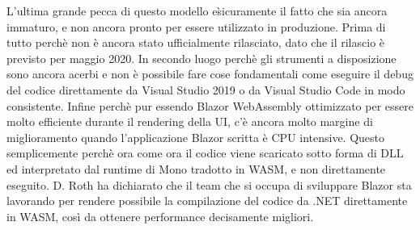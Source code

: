 L'ultima grande pecca di questo modello e\` sicuramente il fatto che sia ancora immaturo, e non ancora pronto per essere utilizzato in produzione.
Prima di tutto perch\`e non \`e ancora stato ufficialmente rilasciato, dato che il rilascio \`e previsto per maggio 2020.
In secondo luogo perch\`e gli strumenti a disposizione sono ancora acerbi e non \`e possibile fare cose fondamentali come eseguire il debug del codice direttamente da Visual Studio 2019 o da Visual Studio Code in modo consistente.
Infine perch\`e pur essendo Blazor WebAssembly ottimizzato per essere molto efficiente durante il rendering della UI, c'\`e ancora molto margine di miglioramento quando l'applicazione Blazor scritta \`e CPU intensive.
Questo semplicemente perch\`e ora come ora il codice viene scaricato sotto forma di DLL ed interpretato dal runtime di Mono tradotto in WASM, e non direttamente eseguito.
D. Roth ha dichiarato che il team che si occupa di sviluppare Blazor sta lavorando per rendere possibile la compilazione del codice da .NET direttamente in WASM, cos\`i da ottenere performance decisamente migliori\cite{blazorModelsScenarios}.